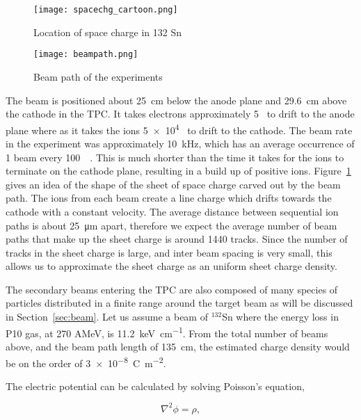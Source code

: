 \begin{figure}[!htb]
\centering
\texttt{[image: spacechg\_cartoon.png]}
\caption{Location of space charge in 132 Sn}
\label{fig:spacechg_cartoon}
\end{figure}


\begin{figure}[!htb]
\centering
\texttt{[image: beampath.png]}
\caption{Beam path of the experiments}
\label{fig:beampaths}
\end{figure}
 
 
 The beam is positioned about \SI{25}{\centi\metre} below the anode plane and \SI{29.6}{\centi\metre} above the cathode in the TPC. It takes electrons approximately 5\si{\micro\sec} to drift to the anode plane where as it takes the ions \num{5e4}\si{\micro\sec} to drift to the cathode. The beam rate in the experiment was approximately \SI{10}{\kilo\hertz}, which has an average occurrence of 1 beam every \SI{100}{\micro\sec}. This is  much shorter than the time it takes for the ions to terminate on the cathode plane, resulting in a build up of positive ions. Figure~\ref{fig:spacechg_cartoon} gives an idea of the shape of the sheet of space charge carved out by the beam path. The ions from each beam create a line charge which drifts towards the cathode with a constant velocity. The average distance between sequential ion paths is about \SI{25}{\micro\metre} apart, therefore we expect the average number of beam paths that make up the sheet charge is around \num{1440} tracks. Since the number of tracks in the sheet charge is large, and inter beam spacing is very small, this allows us to approximate the sheet charge as an uniform sheet charge density. 
 
 The secondary beams entering the TPC are also composed of many species of particles distributed in a finite range around the target beam as will be discussed in Section~\ref{sec:beam}. Let us assume a beam of ${}^{132}$Sn where the energy loss in P10 gas, at 270 AMeV, is \SI{11.2}{\kilo\electronvolt\per\centi\metre}. From the total number of beams above, and the beam path length of \SI{135}{\centi\metre}, the estimated charge density would be on the order of \SI{3e-8}{\coulomb\per\metre\squared}. 
 

The electric potential can be calculated by solving Poisson's equation, 

\begin{equation}
\nabla^2 \phi = \rho,
\end{equation}

